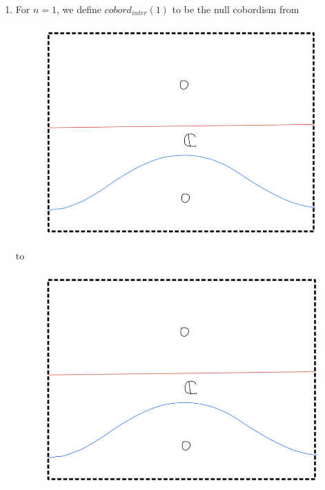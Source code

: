\begin{enumerate}[label = (\roman*)]
\item For $n=1$, we define $cobord_{inter}(1)$ to be the null cobordism from
\begin{figure}[H]
    \centering
    \includegraphics[scale = 0.95]{diagrams/cobord_inter/2.png}
    \caption{}
    \label{fig:your-label}
\end{figure}
to
\begin{figure}[H]
    \centering
    \includegraphics[scale = 0.95]{diagrams/cobord_inter/3.png}
    \caption{}
    \label{fig:your-label}
\end{figure}


\end{enumerate}
